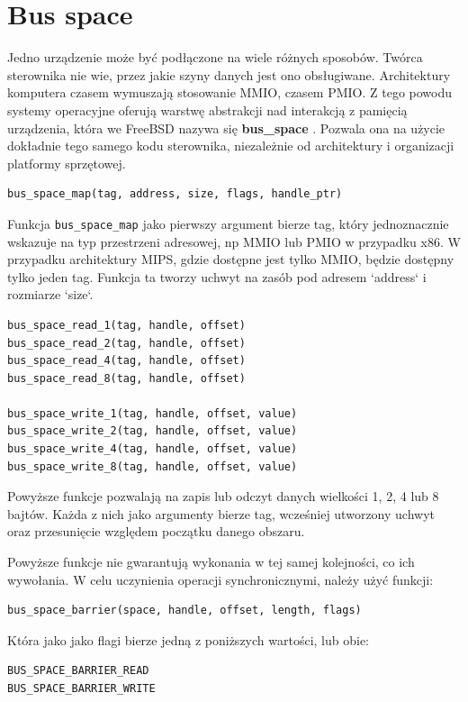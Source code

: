 \documentclass[shortabstract,inz]{iithesis}
\begin{document}
\section{Bus space} %
Jedno urządzenie może być podłączone na wiele różnych sposobów. Twórca sterownika nie wie, 
przez jakie szyny danych jest ono obsługiwane. 
Architektury komputera czasem wymuszają stosowanie 
MMIO, czasem PMIO. Z tego powodu systemy operacyjne oferują warstwę abstrakcji nad interakcją z 
pamięcią urządzenia, która we FreeBSD nazywa się \textbf{bus\_space} \cite{man:bus_space_9}. Pozwala ona na użycie dokładnie 
tego samego kodu sterownika, niezależnie od architektury i organizacji platformy sprzętowej.

\begin{lstlisting}
bus_space_map(tag, address, size, flags, handle_ptr)
\end{lstlisting}

Funkcja \texttt{bus\_space\_map} jako pierwszy argument bierze tag, który jednoznacznie wskazuje 
na typ przestrzeni adresowej, np MMIO lub PMIO w przypadku x86. W przypadku architektury MIPS, 
gdzie dostępne jest tylko MMIO, będzie dostępny tylko jeden tag. Funkcja ta 
tworzy uchwyt na zasób pod adresem `address` i rozmiarze `size`. 


\begin{lstlisting}
bus_space_read_1(tag, handle, offset)
bus_space_read_2(tag, handle, offset)
bus_space_read_4(tag, handle, offset)
bus_space_read_8(tag, handle, offset)

bus_space_write_1(tag, handle, offset, value)
bus_space_write_2(tag, handle, offset, value)
bus_space_write_4(tag, handle, offset, value)
bus_space_write_8(tag, handle, offset, value)
\end{lstlisting}

Powyższe funkcje pozwalają na zapis lub odczyt danych wielkości 1, 2, 4 lub 8 bajtów. Każda z nich 
jako argumenty bierze tag, wcześniej utworzony uchwyt oraz przesunięcie względem początku danego obszaru. 

Powyższe funkcje nie gwarantują wykonania w tej samej kolejności, co ich wywołania. 
W celu uczynienia operacji synchronicznymi, należy użyć funkcji:
\begin{lstlisting}
bus_space_barrier(space, handle, offset, length, flags)
\end{lstlisting}

Która jako jako flagi bierze jedną z poniższych wartości, lub obie:
\begin{lstlisting}
BUS_SPACE_BARRIER_READ 
BUS_SPACE_BARRIER_WRITE 
\end{lstlisting}
\end{document}
